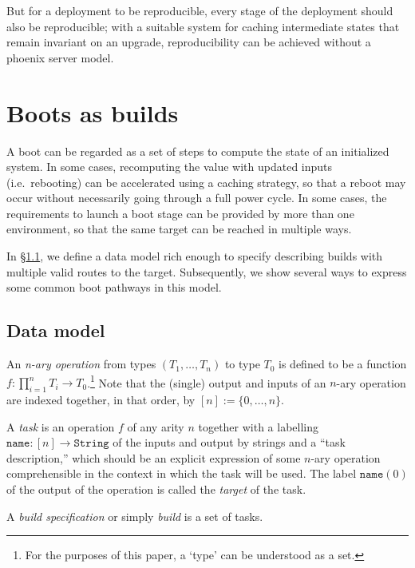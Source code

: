  But for a deployment to be reproducible, every stage of the deployment should also be reproducible; with a suitable system for caching intermediate states that remain invariant on an upgrade, reproducibility can be achieved without a phoenix server model.


\section{Boots as builds} \label{build}

A boot can be regarded as a set of steps to compute the state of an initialized system. 
%
In some cases, recomputing the value with updated inputs (i.e.~rebooting) can be accelerated using a caching strategy, so that a reboot may occur without necessarily going through a full power cycle.
%
In some cases, the requirements to launch a boot stage can be provided by more than one environment, so that the same target can be reached in multiple ways.

In \S\ref{data-model}, we define a data model rich enough to specify describing builds with multiple valid routes to the target.
%
Subsequently, we show several ways to express some common boot pathways in this model.

\subsection{Data model} \label{data-model}

\begin{definition}
  
  An \emph{n-ary operation} from types \((T_1,\ldots,T_n)\) to type \(T_0\) is defined to be a function \(f:\prod_{i=1}^n T_i \rightarrow T_0\).\footnote{For the purposes of this paper, a `type' can be understood as a set.}
  Note that the (single) output and inputs of an \(n\)-ary operation are indexed together, in that order, by \([n]:=\{0,\ldots,n\}\).

  A \emph{task} is an operation \(f\) of any arity \(n\) together with a labelling \(\mathtt{name}:[n]\rightarrow \mathtt{String}\) of the inputs and output by strings and a ``task description,'' which should be an explicit expression of some $n$-ary operation comprehensible in the context in which the task will be used.
  The label \(\mathtt{name}(0)\) of the output of the operation is called the \emph{target} of the task.

  A \emph{build specification} or simply \emph{build} is a set of tasks.

\end{definition}

